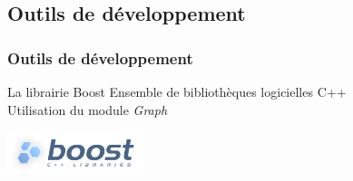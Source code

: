 \subsection{Outils de d\'eveloppement}
\frame
{
\frametitle{Outils de d\'eveloppement}
% 

\begin{minipage}{0.45\textwidth}
\begin{flushleft}
\begin{block}{La librairie Boost}
Ensemble de biblioth\`eques logicielles C++\\
Utilisation du module \textit{Graph}
\end{block}
\end{flushleft}
\end{minipage}
\begin{minipage}{0.45\textwidth}
\begin{flushright}
\begin{center}
\includegraphics[width=4cm]{logo-boost.png}
\end{center}
\end{flushright}
\end{minipage}

}
